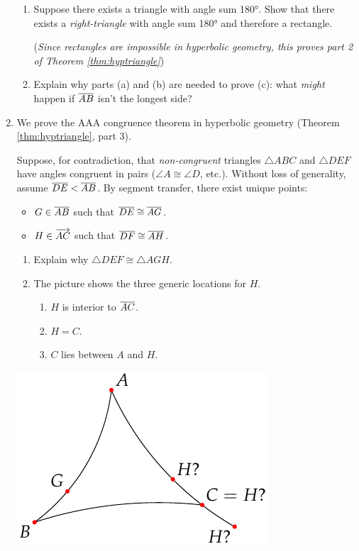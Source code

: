 \begin{exercises}
\begin{enumerate}
\begin{enumerate}
	    \item Suppose there exists a triangle with angle sum \ang{180}. Show that there exists a \emph{right-triangle} with angle sum \ang{180} and therefore a rectangle.\par
	  	(\emph{Since rectangles are impossible in hyperbolic geometry, this proves part 2 of Theorem \ref{thm:hyptriangle}})
	  	
	  	\item Explain why parts (a) and (b) are needed to prove (c): what \emph{might} happen if $\overline{AB}$ isn't the longest side? 
	 	\end{enumerate}

	  
	  
	  \item\label{exs:aaacongproof} We prove the AAA congruence theorem in hyperbolic geometry (Theorem \ref{thm:hyptriangle}, part 3).\par
	  Suppose, for contradiction, that \emph{non-congruent} triangles $\triangle ABC$ and $\triangle DEF$ have angles congruent in pairs ($\angle A\cong\angle D$, etc.). Without loss of generality, assume $\overline{DE}<\overline{AB}$. By segment transfer, there exist unique points:\par
		\begin{minipage}[t]{0.6\linewidth}\vspace{-4pt}
		  \begin{itemize}
		    \item $G\in\overline{AB}$ such that $\overline{DE}\cong\overline{AG}$.
		    \item $H\in\overrightarrow{AC}$ such that $\overline{DF}\cong\overline{AH}$.
		  \end{itemize}
		  \begin{enumerate}
		    \item Explain why $\triangle DEF\cong\triangle AGH$.
		  	\item The picture shows the three generic locations for $H$.
		  	\begin{enumerate}\itemsep0pt
		    	\item $H$ is interior to $\overline{AC}$.
		    	\item $H=C$.
		    	\item $C$ lies between $A$ and $H$.
		  	\end{enumerate}
		  \end{enumerate}
	  \end{minipage}
	  \hfill
	  \begin{minipage}[t]{0.39\linewidth}\vspace{-5pt}
	   \flushright\includegraphics[scale=0.95]{basic-aaa}

\end{minipage}
\end{enumerate}
\end{exercises}
